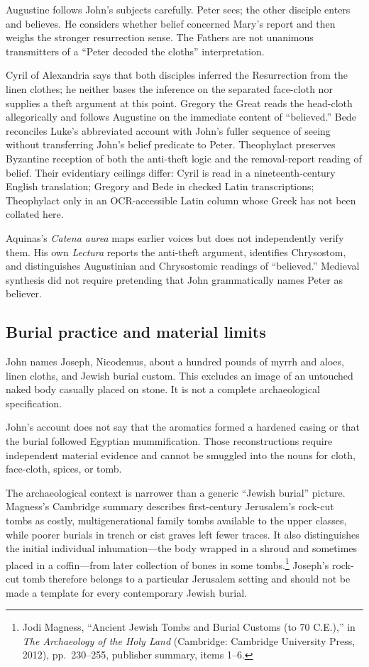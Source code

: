 Augustine follows John's subjects carefully. Peter sees; the other disciple
enters and believes. He considers whether belief concerned Mary's report and
then weighs the stronger resurrection sense. The Fathers are not unanimous
transmitters of a ``Peter decoded the cloths'' interpretation.

Cyril of Alexandria says that both disciples inferred the Resurrection from
the linen clothes; he neither bases the inference on the separated face-cloth
nor supplies a theft argument at this point. Gregory the Great reads the
head-cloth allegorically and follows Augustine on the immediate content of
``believed.'' Bede reconciles Luke's abbreviated account with John's fuller
sequence of seeing without transferring John's belief predicate to Peter.
Theophylact preserves Byzantine reception of both the anti-theft logic and the
removal-report reading of belief. Their evidentiary ceilings differ: Cyril is
read in a nineteenth-century English translation; Gregory and Bede in checked
Latin transcriptions; Theophylact only in an OCR-accessible Latin column whose
Greek has not been collated here.

Aquinas's \emph{Catena aurea} maps earlier voices but does not independently
verify them. His own \emph{Lectura} reports the anti-theft argument, identifies
Chrysostom, and distinguishes Augustinian and Chrysostomic readings of
``believed.'' Medieval synthesis did not require pretending that John
grammatically names Peter as believer.

\subsection{Burial practice and material limits}

John names Joseph, Nicodemus, about a hundred pounds of myrrh and aloes, linen
cloths, and Jewish burial custom. This excludes an image of an untouched naked
body casually placed on stone. It is not a complete archaeological
specification.

John's account does not say that the aromatics formed a hardened casing or
that the burial followed Egyptian mummification. Those reconstructions require
independent material evidence and cannot be smuggled into the nouns for cloth,
face-cloth, spices, or tomb.

The archaeological context is narrower than a generic ``Jewish burial''
picture. Magness's Cambridge summary describes first-century Jerusalem's
rock-cut tombs as costly, multigenerational family tombs available to the upper
classes, while poorer burials in trench or cist graves left fewer traces. It
also distinguishes the initial individual inhumation---the body wrapped in a
shroud and sometimes placed in a coffin---from later collection of bones in
some tombs.\footnote{Jodi Magness, ``Ancient Jewish Tombs and Burial Customs
(to 70 C.E.),'' in \emph{The Archaeology of the Holy Land} (Cambridge:
Cambridge University Press, 2012), pp.~230--255, publisher summary, items
1--6.} Joseph's rock-cut tomb therefore belongs to a particular Jerusalem
setting and should not be made a template for every contemporary Jewish
burial.

